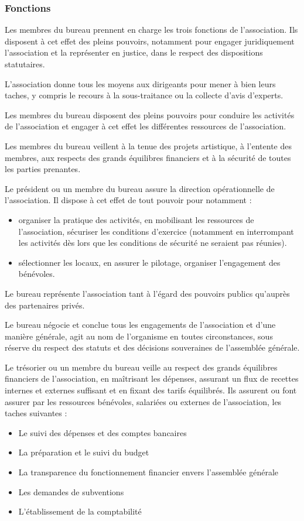 \documentclass[a4paper,french,10pt]{article}
\begin{document}
\subsubsection{Fonctions}
\label{sec:fonctions}

Les membres du bureau prennent en charge les trois fonctions de
l’association.  Ils disposent à cet effet des pleins pouvoirs,
notamment pour engager juridiquement l’association et la représenter
en justice, dans le respect des dispositions statutaires.

L’association donne tous les moyens aux dirigeants pour mener à bien
leurs taches, y compris le recours à la sous-traitance ou la collecte
d’avis d’experts.

Les membres du bureau disposent des pleins pouvoirs pour conduire les
activités de l’association et engager à cet effet les différentes
ressources de l’association.

Les membres du bureau veillent à la tenue des projets artistique, à
l'entente des membres, aux respects des grands équilibres financiers
et à la sécurité de toutes les parties prenantes.  


Le président ou un membre du bureau assure la direction opérationnelle de
l’association. Il dispose à cet effet de tout pouvoir pour notamment :
\begin{itemize}
\item organiser la pratique des activités, en mobilisant les
  ressources de l’association, sécuriser les conditions d’exercice
  (notamment en interrompant les activités dès lors que les conditions
  de sécurité ne seraient pas réunies).
\item sélectionner les locaux, en assurer le pilotage, organiser
  l’engagement des bénévoles.
\end{itemize}

Le bureau représente l’association tant à l’égard des pouvoirs
publics qu’auprès des partenaires privés.

Le bureau négocie et conclue tous les engagements de l’association et
d’une manière générale, agit au nom de l’organisme en toutes
circonstances, sous réserve du respect des statuts et des décisions
souveraines de l’assemblée générale.




Le trésorier ou un membre du bureau veille au respect des grands équilibres financiers de
l’association, en maîtrisant les dépenses, assurant un flux de
recettes internes et externes suffisant et en fixant des tarifs
équilibrés. Ils assurent ou font assurer par les ressources bénévoles,
salariées ou externes de l’association, les taches suivantes :
\begin{itemize}
\item Le suivi des dépenses et des comptes bancaires
\item La préparation et le suivi du budget
\item La transparence du fonctionnement financier envers l’assemblée générale
\item Les demandes de subventions
\item L’établissement de la comptabilité
\end{itemize}
\end{document}
